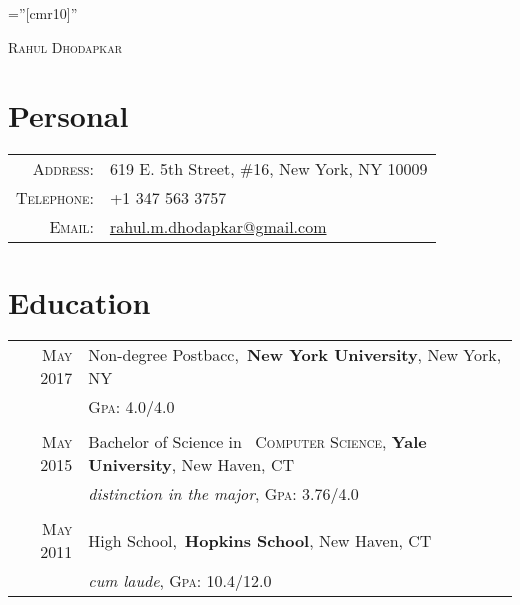 \documentclass[a4paper,10pt]{article}
\begin{document}

\pagestyle{empty} %

\font\fb=''[cmr10]'' %

\par{\centering
		{\Huge \textsc{Rahul Dhodapkar}
	}\bigskip\par}

\section{Personal}

\begin{tabular}{rl}
    \textsc{Address:}   & 619 E. 5th Street, \#16, New York, NY 10009 \\
    \textsc{Telephone:}      & +1 347 563 3757\\
    \textsc{Email:}       & \href{mailto:rahul.m.dhodapkar@gmail.com}{rahul.m.dhodapkar@gmail.com}
\end{tabular}

\section{Education}
\begin{tabular}{rl}	
 \textsc{May} 2017 & Non-degree Postbacc,\
 \textbf{New York University}, New York, NY\\
&\normalsize \textsc{Gpa}: 4.0/4.0\\
\\
 \textsc{May} 2015 & Bachelor of Science in \
 \textsc{Computer Science}, \textbf{Yale University}, New Haven, CT\\
&\small\emph{distinction in the major}, \normalsize \textsc{Gpa}: 3.76/4.0\\
\\
\textsc{May} 2011 & High School,\
 \normalsize \textbf{Hopkins School}, New Haven, CT\\
&\small\emph{cum laude}, \normalsize \textsc{Gpa}: 10.4/12.0\\
\end{tabular}
\end{document}
